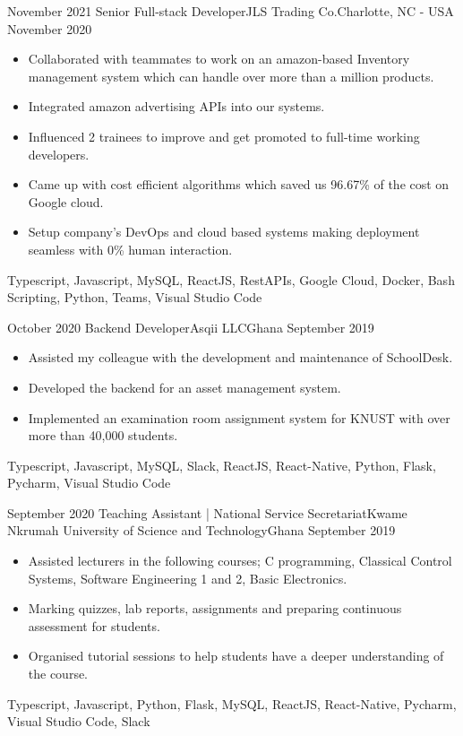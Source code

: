 \begin{experiences}
      \experience
    {November 2021}   {Senior Full-stack Developer}{JLS Trading Co.}{Charlotte, NC - USA}
    {November 2020} {
                      \begin{itemize}
			\item Collaborated with teammates to work on an amazon-based Inventory management system which can handle over more than a million products.
			\item Integrated amazon advertising APIs into our systems.
			\item Influenced 2 trainees to improve and get promoted to full-time working developers.
			\item Came up with cost efficient algorithms which saved us 96.67\% of the cost on Google cloud.
			\item Setup company’s DevOps and cloud based systems making deployment seamless with 0\% human interaction.
		    \end{itemize}
                    }
                    {Typescript, Javascript, MySQL, ReactJS, RestAPIs, Google Cloud, Docker, Bash Scripting, Python, Teams, Visual Studio Code}
  \emptySeparator

  
  \experience
    {October 2020}   {Backend Developer}{Asqii LLC}{Ghana}
    {September 2019} {
                      \begin{itemize}
                        \item Assisted my colleague with the development and maintenance of SchoolDesk.
                        \item Developed the backend for an asset management system.
                        \item Implemented an examination room assignment system for KNUST with over more than 40,000 students.
                      \end{itemize}
                    }
                    {Typescript, Javascript, MySQL, Slack, ReactJS, React-Native, Python, Flask, Pycharm, Visual Studio Code}
  \emptySeparator
  
  
    \experience
    {September 2020}   {Teaching Assistant | National Service Secretariat}{Kwame Nkrumah University of Science and Technology}{Ghana}
    {September 2019} {
                      \begin{itemize}
                        \item Assisted lecturers in the following courses; C programming, Classical Control Systems, Software Engineering 1 and 2, Basic Electronics.
                        \item Marking quizzes, lab reports, assignments and preparing continuous assessment for students.
                        \item Organised tutorial sessions to help students have a deeper understanding of the course.
                      \end{itemize}
                    }
                    {Typescript, Javascript, Python, Flask, MySQL, ReactJS, React-Native, Pycharm, Visual Studio Code, Slack}
  \emptySeparator
  

\end{experiences}
